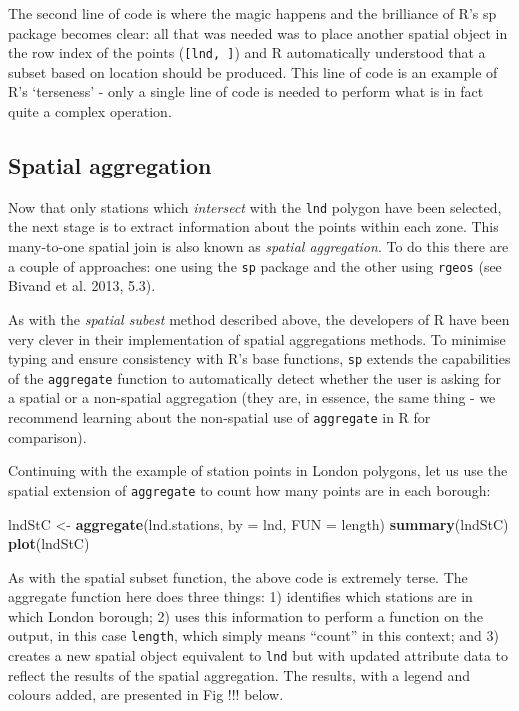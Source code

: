 \documentclass[]{article}
\newenvironment{Shaded}{}{}
\newcommand{\KeywordTok}[1]{\textcolor[rgb]{0.00,0.44,0.13}{\textbf{{#1}}}}
\newcommand{\DataTypeTok}[1]{\textcolor[rgb]{0.56,0.13,0.00}{{#1}}}
\newcommand{\NormalTok}[1]{{#1}}
\begin{document}
The second line of code is where the magic happens and the brilliance of
R's sp package becomes clear: all that was needed was to place another
spatial object in the row index of the points (\texttt{{[}lnd, {]}}) and
R automatically understood that a subset based on location should be
produced. This line of code is an example of R's `terseness' - only a
single line of code is needed to perform what is in fact quite a complex
operation.

\subsection{Spatial aggregation}

Now that only stations which \emph{intersect} with the \texttt{lnd}
polygon have been selected, the next stage is to extract information
about the points within each zone. This many-to-one spatial join is also
known as \emph{spatial aggregation}. To do this there are a couple of
approaches: one using the \texttt{sp} package and the other using
\texttt{rgeos} (see Bivand et al. 2013, 5.3).

As with the \emph{spatial subest} method described above, the developers
of R have been very clever in their implementation of spatial
aggregations methods. To minimise typing and ensure consistency with R's
base functions, \texttt{sp} extends the capabilities of the
\texttt{aggregate} function to automatically detect whether the user is
asking for a spatial or a non-spatial aggregation (they are, in essence,
the same thing - we recommend learning about the non-spatial use of
\texttt{aggregate} in R for comparison).

Continuing with the example of station points in London polygons, let us
use the spatial extension of \texttt{aggregate} to count how many points
are in each borough:

\begin{Shaded}
\begin{Highlighting}[]
\NormalTok{lndStC <- }\KeywordTok{aggregate}\NormalTok{(lnd.stations, }\DataTypeTok{by =} \NormalTok{lnd, }\DataTypeTok{FUN =} \NormalTok{length)}
\KeywordTok{summary}\NormalTok{(lndStC)}
\KeywordTok{plot}\NormalTok{(lndStC)}
\end{Highlighting}
\end{Shaded}
As with the spatial subset function, the above code is extremely terse.
The aggregate function here does three things: 1) identifies which
stations are in which London borough; 2) uses this information to
perform a function on the output, in this case \texttt{length}, which
simply means ``count'' in this context; and 3) creates a new spatial
object equivalent to \texttt{lnd} but with updated attribute data to
reflect the results of the spatial aggregation. The results, with a
legend and colours added, are presented in Fig !!! below.
\end{document}
